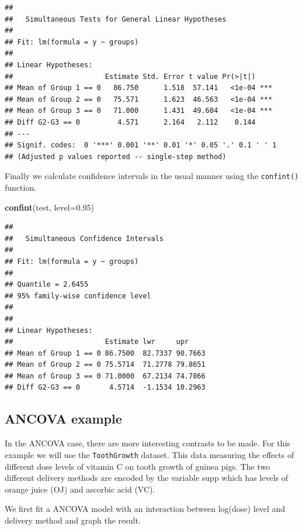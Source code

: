 \documentclass[]{book}
\newenvironment{Shaded}{\begin{snugshade}}{\end{snugshade}}
\newcommand{\KeywordTok}[1]{\textcolor[rgb]{0.13,0.29,0.53}{\textbf{{#1}}}}
\newcommand{\DataTypeTok}[1]{\textcolor[rgb]{0.13,0.29,0.53}{{#1}}}
\newcommand{\FloatTok}[1]{\textcolor[rgb]{0.00,0.00,0.81}{{#1}}}
\newcommand{\NormalTok}[1]{{#1}}
\theoremstyle{definition}
\theoremstyle{definition}
\theoremstyle{remark}
\begin{document}
\begin{verbatim}
## 
##   Simultaneous Tests for General Linear Hypotheses
## 
## Fit: lm(formula = y ~ groups)
## 
## Linear Hypotheses:
##                      Estimate Std. Error t value Pr(>|t|)    
## Mean of Group 1 == 0   86.750      1.518  57.141   <1e-04 ***
## Mean of Group 2 == 0   75.571      1.623  46.563   <1e-04 ***
## Mean of Group 3 == 0   71.000      1.431  49.604   <1e-04 ***
## Diff G2-G3 == 0         4.571      2.164   2.112    0.144    
## ---
## Signif. codes:  0 '***' 0.001 '**' 0.01 '*' 0.05 '.' 0.1 ' ' 1
## (Adjusted p values reported -- single-step method)
\end{verbatim}

Finally we calculate confidence intervals in the usual manner using the
\texttt{confint()} function.

\begin{Shaded}
\begin{Highlighting}[]
\KeywordTok{confint}\NormalTok{(test, }\DataTypeTok{level=}\FloatTok{0.95}\NormalTok{)}
\end{Highlighting}
\end{Shaded}

\begin{verbatim}
## 
##   Simultaneous Confidence Intervals
## 
## Fit: lm(formula = y ~ groups)
## 
## Quantile = 2.6455
## 95% family-wise confidence level
##  
## 
## Linear Hypotheses:
##                      Estimate lwr     upr    
## Mean of Group 1 == 0 86.7500  82.7337 90.7663
## Mean of Group 2 == 0 75.5714  71.2778 79.8651
## Mean of Group 3 == 0 71.0000  67.2134 74.7866
## Diff G2-G3 == 0       4.5714  -1.1534 10.2963
\end{verbatim}

\subsection{ANCOVA example}\label{ancova-example}

In the ANCOVA case, there are more interesting contrasts to be made. For
this example we will use the \texttt{ToothGrowth} dataset. This data
measuring the effects of different dose levels of vitamin C on tooth
growth of guinea pigs. The two different delivery methods are encoded by
the variable supp which has levels of orange juice (OJ) and ascorbic
acid (VC).

We first fit a ANCOVA model with an interaction between log(dose) level
and delivery method and graph the result.
\end{document}
